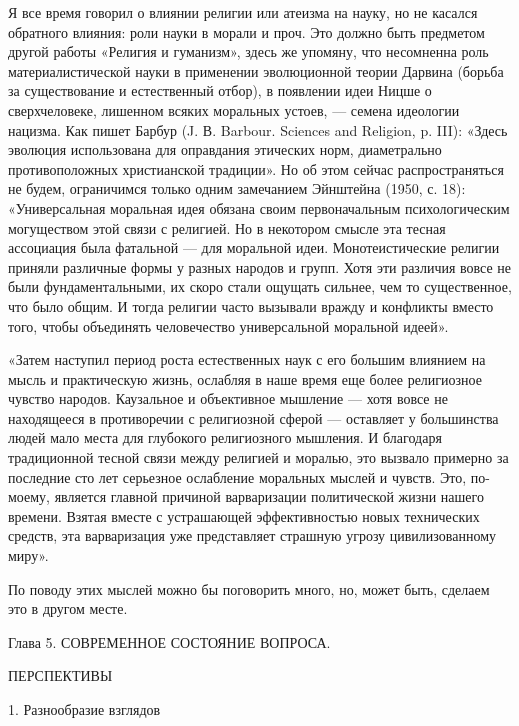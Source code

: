 Я  все  время  говорил  о   влиянии  религии  или  атеизма  на  науку,
но  не  касался  обратного  влияния:  роли  науки  в  морали  и  проч.
Это  должно  быть  предметом   другой  работы  «Религия  и  гуманизм»,
здесь  же  упомяну, что  несомненна  роль  материалистической науки  в
применении  эволюционной  теории   Дарвина  (борьба  за  существование
и  естественный  отбор),  в  появлении  идеи  Ницше  о  сверхчеловеке,
лишенном  всяких  моральных  устоев,  ---  семена  идеологии  нацизма.
Как  пишет   Барбур  (J.  В.   Barbour.  Sciences  and   Religion,  p.
III):  «Здесь эволюция  использована  для  оправдания этических  норм,
диаметрально  противоположных  христианской   традиции».  Но  об  этом
сейчас распространяться не будем,  ограничимся только одним замечанием
Эйнштейна (1950,  с. 18): «Универсальная моральная  идея обязана своим
первоначальным  психологическим  могуществом  этой связи  с  религией.
Но  в  некотором  смысле  эта тесная  ассоциация  была  фатальной  ---
для  моральной   идеи.  Монотеистические  религии   приняли  различные
формы  у разных  народов  и групп.  Хотя эти  различия  вовсе не  были
фундаментальными, их скоро стали ощущать сильнее, чем то существенное,
что  было общим.  И тогда  религии часто  вызывали вражду  и конфликты
вместо  того, чтобы  объединять  человечество универсальной  моральной
идеей».

«Затем наступил период роста естественных  наук с его большим влиянием
на  мысль  и практическую  жизнь,  ослабляя  в  наше время  еще  более
религиозное  чувство народов.  Каузальное и  объективное мышление  ---
хотя  вовсе не  находящееся в  противоречии с  религиозной сферой  ---
оставляет у  большинства людей  мало места для  глубокого религиозного
мышления.  И  благодаря  традиционной   тесной  связи  между  религией
и  моралью,  это  вызвало  примерно за  последние  сто  лет  серьезное
ослабление моральных мыслей и  чувств. Это, по-моему, является главной
причиной  варваризации  политической   жизни  нашего  времени.  Взятая
вместе  с устрашающей  эффективностью новых  технических средств,  эта
варваризация уже представляет страшную угрозу цивилизованному миру».

По  поводу этих  мыслей можно  бы  поговорить много,  но, может  быть,
сделаем это в другом месте.

Глава 5. СОВРЕМЕННОЕ СОСТОЯНИЕ ВОПРОСА.

ПЕРСПЕКТИВЫ

1. Разнообразие взглядов

